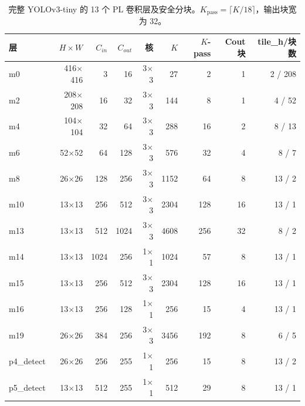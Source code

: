\begin{table}[t]
\centering
\caption{完整 YOLOv3-tiny 的 13 个 PL 卷积层及安全分块。$K_{\mathrm{pass}}=\lceil K/18\rceil$，输出块宽为 32。}
\label{tab:layer-config}
\small
\setlength{\tabcolsep}{4.2pt}
\begin{tabular}{lrrrrrrrr}
\toprule
层 & $H\times W$ & $C_{in}$ & $C_{out}$ & 核 & $K$ & $K$-pass & Cout块 & tile\_h/块数 \\
\midrule
m0 & 416$\times$416 & 3 & 16 & 3$\times$3 & 27 & 2 & 1 & 2 / 208 \\
m2 & 208$\times$208 & 16 & 32 & 3$\times$3 & 144 & 8 & 1 & 4 / 52 \\
m4 & 104$\times$104 & 32 & 64 & 3$\times$3 & 288 & 16 & 2 & 8 / 13 \\
m6 & 52$\times$52 & 64 & 128 & 3$\times$3 & 576 & 32 & 4 & 8 / 7 \\
m8 & 26$\times$26 & 128 & 256 & 3$\times$3 & 1152 & 64 & 8 & 13 / 2 \\
m10 & 13$\times$13 & 256 & 512 & 3$\times$3 & 2304 & 128 & 16 & 13 / 1 \\
m13 & 13$\times$13 & 512 & 1024 & 3$\times$3 & 4608 & 256 & 32 & 8 / 2 \\
m14 & 13$\times$13 & 1024 & 256 & 1$\times$1 & 1024 & 57 & 8 & 13 / 1 \\
m15 & 13$\times$13 & 256 & 512 & 3$\times$3 & 2304 & 128 & 16 & 13 / 1 \\
m16 & 13$\times$13 & 256 & 128 & 1$\times$1 & 256 & 15 & 4 & 13 / 1 \\
m19 & 26$\times$26 & 384 & 256 & 3$\times$3 & 3456 & 192 & 8 & 6 / 5 \\
p4\_detect & 26$\times$26 & 256 & 255 & 1$\times$1 & 256 & 15 & 8 & 13 / 2 \\
p5\_detect & 13$\times$13 & 512 & 255 & 1$\times$1 & 512 & 29 & 8 & 13 / 1 \\
\bottomrule
\end{tabular}
\end{table}
